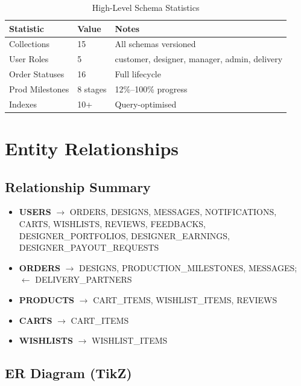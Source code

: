 \documentclass[a4paper,11pt]{article}
\begin{document}
\begin{table}[h!]
\centering
{}
\begin{tabular}{@{}L{3.5cm}L{5cm}L{6cm}@{}}
\toprule
{}
\textbf{Statistic} & \textbf{Value} & \textbf{Notes} \\
\midrule
Collections     & 15            & All schemas versioned \\
User Roles      & 5             & customer, designer, manager, admin, delivery \\
Order Statuses  & 16            & Full lifecycle \\
Prod Milestones & 8 stages      & 12\%--100\% progress \\
Indexes         & 10+           & Query-optimised \\
\bottomrule
\end{tabular}
\caption{High-Level Schema Statistics}
\end{table}

\section{Entity Relationships}

\subsection{Relationship Summary}

\begin{mdframed}[linecolor=primary!50,backgroundcolor=primary!5]
\begin{itemize}[noitemsep]
  \item \textbf{USERS} $\longrightarrow$ ORDERS, DESIGNS, MESSAGES, NOTIFICATIONS, CARTS, WISHLISTS, REVIEWS, FEEDBACKS, DESIGNER\_PORTFOLIOS, DESIGNER\_EARNINGS, DESIGNER\_PAYOUT\_REQUESTS
  \item \textbf{ORDERS} $\longrightarrow$ DESIGNS, PRODUCTION\_MILESTONES, MESSAGES; $\longleftarrow$ DELIVERY\_PARTNERS
  \item \textbf{PRODUCTS} $\longrightarrow$ CART\_ITEMS, WISHLIST\_ITEMS, REVIEWS
  \item \textbf{CARTS} $\longrightarrow$ CART\_ITEMS
  \item \textbf{WISHLISTS} $\longrightarrow$ WISHLIST\_ITEMS
\end{itemize}
\end{mdframed}

\subsection{ER Diagram (TikZ)}
\end{document}
